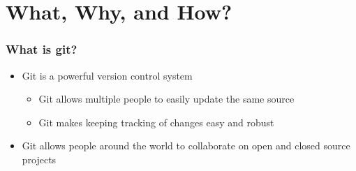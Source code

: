 \documentclass[unknownkeysallowed]{beamer}
\begin{document}
\section{What, Why, and How?}
\begin{frame}
    \frametitle{What is git?}
    \begin{itemize}
        \item{Git is a powerful version control system}
            \begin{itemize}
                \item{Git allows multiple people to easily update the same source}
                \item{Git makes keeping tracking of changes easy and robust}
            \end{itemize}
        \item{Git allows people around the world to collaborate on open and closed source projects}
    \end{itemize}
    \vspace{1cm} %




\end{frame}
\end{document}
